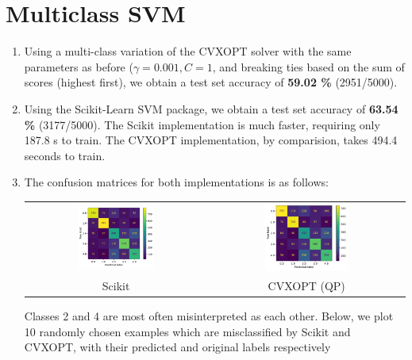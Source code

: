 \documentclass[12pt]{article}
\begin{document}
\section{Multiclass SVM}

\begin{enumerate}[label=(\alph*)]
    \item Using a multi-class variation of the CVXOPT solver with the same parameters as before ($\gamma = 0.001, C = 1$, and breaking ties based on the sum of scores (highest first), we obtain a test set accuracy of \textbf{59.02 \%} (2951/5000). 
    \item Using the Scikit-Learn SVM package, we obtain a test set accuracy of \textbf{63.54 \%} (3177/5000). The Scikit implementation is much faster, requiring only 187.8 s to train. The CVXOPT implementation, by comparision, takes 494.4 seconds to train.

    \item The confusion matrices for both implementations is as follows:
    \begin{center}
        \begin{tabular}{c c}
            \includegraphics[width=0.44\textwidth]{../Q3/Qc/sk_cmat.pdf} & \includegraphics[width=0.44\textwidth]{../Q3/Qc/qp_cmat.pdf} \\
            Scikit & CVXOPT (QP)
        \end{tabular}
    \end{center}

    Classes 2 and 4 are most often misinterpreted as each other. Below, we plot 10 randomly chosen examples which are misclassified by Scikit and CVXOPT, with their {\color{red} predicted} and {\color{green} original} labels respectively


\end{enumerate}
\end{document}
